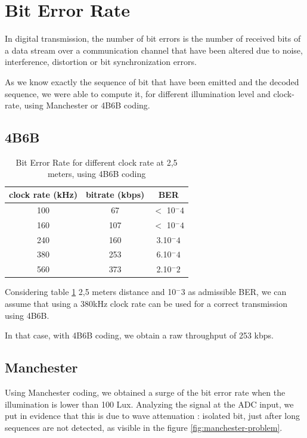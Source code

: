 \section{Bit Error Rate}

In digital transmission, the number of bit errors is the number of received bits of a data stream over a communication channel that have been altered due to noise, interference, distortion or bit synchronization errors.

As we know exactly the sequence of bit that have been emitted and the decoded sequence, we were able to compute it, for different illumination level and clock-rate, using Manchester or 4B6B coding.

\subsection{4B6B}

\begin{table}[htbp]
\begin{center}
\begin{tabular}{|c|c|c|}
  \hline
  clock rate (kHz) & bitrate (kbps) & BER \\
  \hline
  100 & 67 & $<$ 10$^-4$ \\
  160 & 107 & $<$ 10$^-4$ \\
  240 & 160 & 3.10$^-4$ \\
  380 & 253 & 6.10$^-4$ \\
  560 & 373 & 2.10$^-2$ \\
  \hline
\end{tabular}
\end{center}
\caption{Bit Error Rate for different clock rate at 2,5 meters, using 4B6B coding}
\label{tab:ber}
\end{table}

Considering table \ref{tab:ber} 2,5 meters distance and 10$^-3$ as admissible BER, we can assume that using a 380kHz clock rate can be used for a correct transmission using 4B6B.

In that case, with 4B6B coding, we obtain a raw throughput of 253 kbps.

\subsection{Manchester}
Using Manchester coding, we obtained a surge of the bit error rate when the illumination is lower than 100 Lux. Analyzing the signal at the ADC input, we put in evidence that this is due to wave attenuation : isolated bit, just after long sequences are not detected, as visible in the figure \ref{fig:manchester-problem}.

